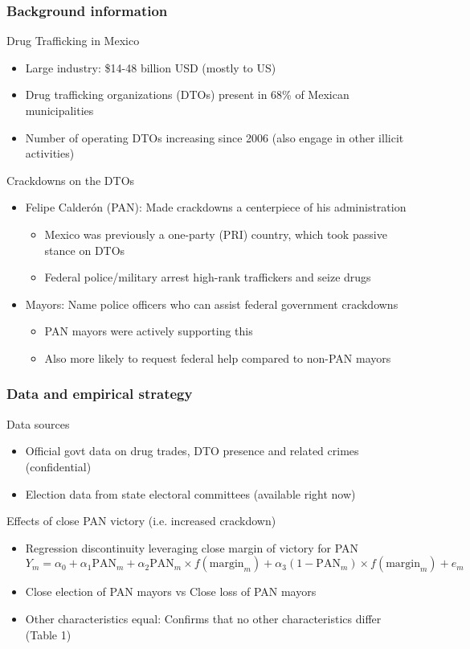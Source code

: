 \documentclass[aspectratio=169]{beamer}
\begin{document}
\begin{frame}
\frametitle{Background information} 
Drug Trafficking in Mexico
\begin{itemize}\setlength\itemsep{3pt}
  \item Large industry: \$14-48 billion USD (mostly to US)
  \item Drug trafficking organizations (DTOs) present in 68\% of Mexican municipalities
  \item Number of operating DTOs increasing since 2006 (also engage in other illicit activities)
\end{itemize}\medskip
Crackdowns on the DTOs
\begin{itemize}\setlength\itemsep{3pt}
  \item Felipe Calderón (PAN): Made crackdowns a centerpiece of his administration
 \begin{itemize}\setlength\itemsep{3pt}
  \item Mexico was previously a one-party (PRI) country, which took passive stance on DTOs
  \item Federal police/military arrest high-rank traffickers and seize drugs 
  \end{itemize}
\item Mayors: Name police officers who can assist federal government crackdowns
\begin{itemize}\setlength\itemsep{3pt}
  \item PAN mayors were actively supporting this
  \item Also more likely to request federal help compared to non-PAN mayors
\end{itemize}  
\end{itemize}\medskip
\end{frame}

\begin{frame}
\frametitle{Data and empirical strategy} 
Data sources
\begin{itemize}\setlength\itemsep{3pt}
  \item Official govt data on drug trades, DTO presence and related crimes (confidential)
  \item Election data from state electoral committees (available right now)
\end{itemize}\medskip
Effects of close PAN victory (i.e. increased crackdown)
\begin{itemize}\setlength\itemsep{3pt}
  \item Regression discontinuity leveraging close margin of victory for PAN
  \[
  Y_m = \alpha_0 + \alpha_1\text{PAN}_m+\alpha_2\text{PAN}_m\times f(\text{margin}_m)+\alpha_3(1-\text{PAN}_m)\times f(\text{margin}_m) +e_m
  \]
  \item Close election of PAN mayors vs Close loss of PAN mayors
  \item Other characteristics equal: Confirms that no other characteristics differ (Table 1)
\end{itemize}\medskip
\end{frame}
\end{document}
